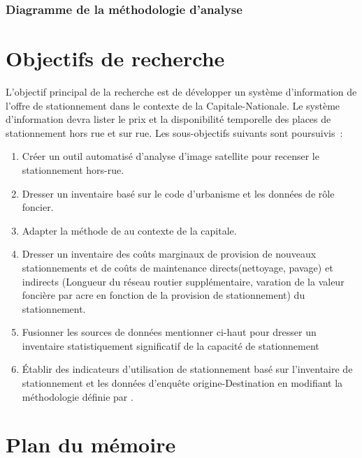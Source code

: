         \subsubsection{Diagramme de la méthodologie d'analyse}


\section{Objectifs de recherche}  %
L'objectif principal de la recherche est de développer un système d'information de l'offre  de stationnement dans le contexte de la Capitale-Nationale. Le système d'information devra lister le prix et la disponibilité temporelle des places de stationnement hors rue et sur rue. Les sous-objectifs suivants sont poursuivis :

\begin{enumerate}
\item Créer un outil automatisé d'analyse d'image satellite pour recenser le stationnement hors-rue.
\item Dresser un inventaire basé sur le code d'urbanisme et les données de rôle foncier.
\item Adapter la méthode de \textcite{Bourdeau:MethodologieAnalyse:2014} au contexte de la capitale.
\item Dresser un inventaire des coûts marginaux de provision de nouveaux stationnements et de coûts de maintenance directs(nettoyage, pavage) et indirects (Longueur du réseau routier supplémentaire, varation de la valeur foncière par acre en fonction de la provision de stationnement) du stationnement.
\item Fusionner les sources de données mentionner ci-haut pour dresser un inventaire statistiquement significatif de la capacité de stationnement
\item Établir des indicateurs d'utilisation de stationnement basé sur l'inventaire de stationnement et les données d'enquête origine-Destination en modifiant la méthodologie définie par \textcite{Diallo:MethodologyParking:2015}.
\end{enumerate}

\section{Plan du mémoire}  %

